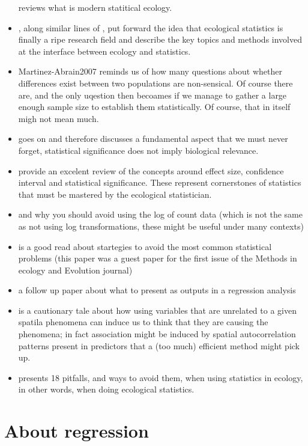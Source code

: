 \documentclass[
]{book}
\begin{document}
\begin{itemize}
  \citet{King2014} reviews what is modern statitical ecology.
\item
  \citet{Gimenez2014}, along similar lines of \citet{King2014}, put forward the idea that ecological statistics is finally a ripe research field and describe the key topics and methods involved at the interface between ecology and statistics.
\item
  Martinez-Abrain2007 reminds us of how many questions about whether differences exist between two populations are non-sensical. Of course there are, and the only uqestion then becoames if we manage to gather a large enough sample size to establish them statistically. Of course, that in itself migh not mean much.
\item
  \citet{Martinez-Abrain2008} goes on and therefore discusses a fundamental aspect that we must never forget, statistical significance does not imply biological relevance.
\item
  \citet{Nakagawa2007} provide an excelent review of the concepts around effect size, confidence interval and statistical significance. These represent cornerstones of statistics that must be mastered by the ecological statistician.
\item
  \citet{OHara2010} and why you should avoid using the log of count data (which is not the same as not using log transformations, these might be useful under many contexts)
\item
  \citet{Zuur2009} is a good read about startegies to avoid the most common statistical problems (this paper was a guest paper for the first issue of the Methods in ecology and Evolution journal)
\item
  \citet{Zuur2016} a follow up paper about what to present as outputs in a regression analysis
\item
  \citet{Fourcade2017} is a cautionary tale about how using variables that are unrelated to a given spatila phenomena can induce us to think that they are causing the phenomena; in fact association might be induced by spatial autocorrelation patterns present in predictors that a (too much) efficient method might pick up.
\item
  \citet{Steel2013} presents 18 pitfalls, and ways to avoid them, when using statistics in ecology, in other words, when doing ecological statistics.
\end{itemize}

\hypertarget{about-regression}{%
\chapter{About regression}\label{about-regression}}
\end{document}

